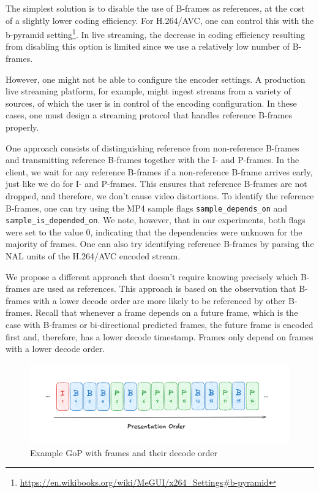 The simplest solution is to disable the use of B-frames as references, at the cost of a slightly lower coding efficiency. For H.264/AVC, one can control this with the b-pyramid setting\footnote{\url{https://en.wikibooks.org/wiki/MeGUI/x264\_Settings\#b-pyramid}}. In live streaming, the decrease in coding efficiency resulting from disabling this option is limited since we use a relatively low number of B-frames.

However, one might not be able to configure the encoder settings. A production live streaming platform, for example, might ingest streams from a variety of sources, of which the user is in control of the encoding configuration. In these cases, one must design a streaming protocol that handles reference B-frames properly.

One approach consists of distinguishing reference from non-reference B-frames and transmitting reference B-frames together with the I- and P-frames. In the client, we wait for any reference B-frames if a non-reference B-frame arrives early, just like we do for I- and P-frames. This ensures that reference B-frames are not dropped, and therefore, we don't cause video distortions. To identify the reference B-frames, one can try using the MP4 sample flags \lstinline{sample_depends_on} and \lstinline{sample_is_depended_on}. %
We note, however, that in our experiments, both flags were set to the value $0$, indicating that the dependencies were unknown for the majority of frames. One can also try identifying reference B-frames by parsing the \ac{NAL} units of the H.264/AVC encoded stream. 

We propose a different approach that doesn't require knowing precisely which B-frames are used as references. This approach is based on the observation that B-frames with a lower decode order are more likely to be referenced by other B-frames. Recall that whenever a frame depends on a future frame, which is the case with B-frames or bi-directional predicted frames, the future frame is encoded first and, therefore, has a lower decode timestamp. Frames only depend on frames with a lower decode order. 

\begin{figure}
    \centering
    \includegraphics[width=\textwidth]{figures/gop_structure.png}
    \caption{Example \ac{GoP} with frames and their decode order}
    \label{fig:gop_structure}
\end{figure}


